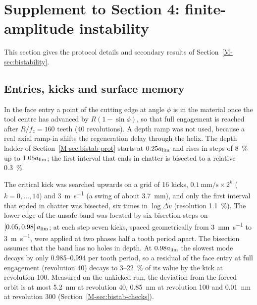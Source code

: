 \section{Supplement to Section 4: finite-amplitude instability}\label{supp:bistab}

This section gives the protocol details and secondary results of Section~\ref{M-sec:bistability}.

\subsection{Entries, kicks and surface memory}\label{supp:bistab-prot}

In the face entry a point of the cutting edge at angle $\phi$ is in the material once the tool centre has advanced by $R(1-\sin\phi)$, so that full engagement is reached after $R/f_z=160$ teeth (40 revolutions). A depth ramp was not used, because a real axial ramp-in shifts the regeneration delay through the helix. The depth ladder of Section~\ref{M-sec:bistab-prot} starts at $0.25a_{\lim}$ and rises in steps of \SI{8}{\percent} up to $1.05a_{\lim}$; the first interval that ends in chatter is bisected to a relative \SI{0.3}{\percent}.

The critical kick was searched upwards on a grid of 16 kicks, $\SI{0.1}{\milli\metre\per\second}\times2^k$ ($k=0,\dots,14$) and \SI{3}{\metre\per\second} (a swing of about \SI{3.7}{\milli\metre}), and only the first interval that ended in chatter was bisected, six times in $\log\Delta v$ (resolution \SI{1.1}{\percent}). The lower edge of the unsafe band was located by six bisection steps on $[0.05,0.98]\,a_{\lim}$; at each step seven kicks, spaced geometrically from \SI{3}{\milli\metre\per\second} to \SI{3}{\metre\per\second}, were applied at two phases half a tooth period apart. The bisection assumes that the band has no holes in depth. At $0.98a_{\lim}$ the slowest mode decays by only 0.985--0.994 per tooth period, so a residual of the face entry at full engagement (revolution 40) decays to 3--\SI{22}{\percent} of its value by the kick at revolution 100. Measured on the unkicked run, the deviation from the forced orbit is at most \SI{5.2}{\nano\metre} at revolution 40, \SI{0.85}{\nano\metre} at revolution 100 and \SI{0.01}{\nano\metre} at revolution 300 (Section~\ref{M-sec:bistab-checks}).

